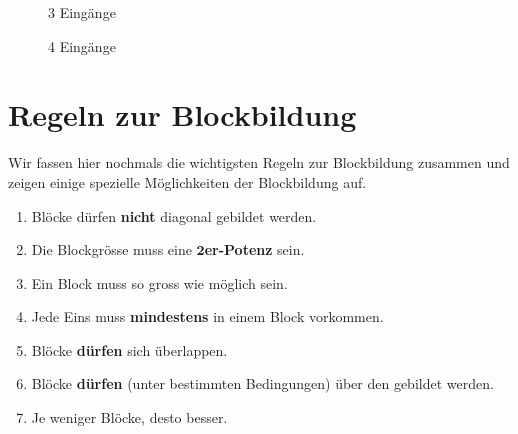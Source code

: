 \begin{figure}[htb]
\begin{minipage}{0.45\textwidth}
\centering
{}
\caption{\num{3} Eingänge}
\label{figure-kv-diagramm-e-3}
\end{minipage}
\hfill
\begin{minipage}{0.45\textwidth}
\centering
{}
\caption{\num{4} Eingänge}
\label{figure-kv-diagramm-e-4}
\end{minipage}
\end{figure}

\newpage

\section{Regeln zur Blockbildung}

Wir fassen hier nochmals die wichtigsten Regeln zur Blockbildung zusammen und zeigen einige spezielle Möglichkeiten der Blockbildung auf.

\begin{enumerate}
\item Blöcke dürfen \textbf{nicht} diagonal gebildet werden.
\item Die Blockgrösse muss eine \textbf{$\mathbf{2}$er-Potenz} sein.
\item Ein Block muss so gross wie möglich sein.
\item Jede Eins muss \textbf{mindestens} in einem Block vorkommen.
\item Blöcke \textbf{dürfen} sich überlappen.
\item Blöcke \textbf{dürfen} (unter bestimmten Bedingungen) über den  gebildet werden.
\item Je weniger Blöcke, desto besser.
\end{enumerate}

